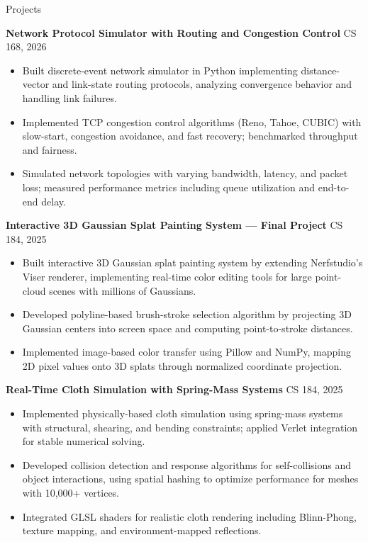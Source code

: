 \documentclass{resume}
\begin{document}
\begin{rSection}{Projects}

\textbf{Network Protocol Simulator with Routing and Congestion Control} \hfill CS 168, 2026
\begin{itemize}
  \item Built discrete-event network simulator in Python implementing distance-vector and link-state routing protocols, analyzing convergence behavior and handling link failures.
  \item Implemented TCP congestion control algorithms (Reno, Tahoe, CUBIC) with slow-start, congestion avoidance, and fast recovery; benchmarked throughput and fairness.
  \item Simulated network topologies with varying bandwidth, latency, and packet loss; measured performance metrics including queue utilization and end-to-end delay.
\end{itemize}

\textbf{Interactive 3D Gaussian Splat Painting System — Final Project} \hfill CS 184, 2025
\begin{itemize}
  \item Built interactive 3D Gaussian splat painting system by extending Nerfstudio's Viser renderer, implementing real-time color editing tools for large point-cloud scenes with millions of Gaussians.
  \item Developed polyline-based brush-stroke selection algorithm by projecting 3D Gaussian centers into screen space and computing point-to-stroke distances.
  \item Implemented image-based color transfer using Pillow and NumPy, mapping 2D pixel values onto 3D splats through normalized coordinate projection.
\end{itemize}

\textbf{Real-Time Cloth Simulation with Spring-Mass Systems} \hfill CS 184, 2025
\begin{itemize}
  \item Implemented physically-based cloth simulation using spring-mass systems with structural, shearing, and bending constraints; applied Verlet integration for stable numerical solving.
  \item Developed collision detection and response algorithms for self-collisions and object interactions, using spatial hashing to optimize performance for meshes with 10,000+ vertices.
  \item Integrated GLSL shaders for realistic cloth rendering including Blinn-Phong, texture mapping, and environment-mapped reflections.
\end{itemize}


\end{rSection}
\end{document}
